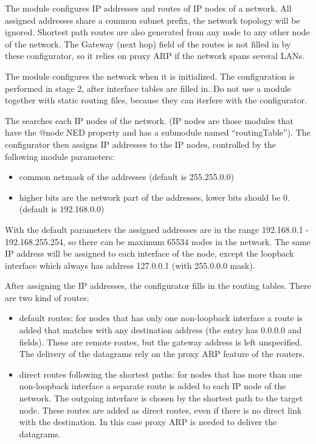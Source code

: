 The  module configures
IP addresses and routes of IP nodes of a network.
All assigned addresses share a common subnet prefix,
the network topology will be ignored. Shortest path
routes are also generated from any node to any other
node of the network. The Gateway (next hop) field of the routes
is not filled in by these configurator, so it relies
on proxy ARP if the network spans several LANs.


The  module configures
the network when it is initialized. The configuration
is performed in stage 2, after interface tables are
filled in. Do not use a 
module together with static routing files, because they
can iterfere with the configurator.

The  searches each IP nodes of the network.
(IP nodes are those modules that have the @node NED property and
has a  submodule named ``routingTable'').
The configurator then assigns IP addresses to the IP nodes, controlled
by the following module parameters:
\begin{itemize}
  \item {} common netmask of the addresses (default is 255.255.0.0)
  \item {} higher bits are the network part of the addresses,
        lower bits should be 0. (default is 192.168.0.0)
\end{itemize}

With the default parameters the assigned addresses are in the range
192.168.0.1 - 192.168.255.254, so there can be maximum 65534 nodes in the
network. The same IP address will be assigned to each interface
of the node, except the loopback interface which always has address 127.0.0.1
(with 255.0.0.0 mask).

After assigning the IP addresses, the configurator fills in the routing tables.
There are two kind of routes:
\begin{itemize}
  \item default routes: for nodes that has only one non-loopback interface
        a route is added that matches with any destination address
        (the entry has 0.0.0.0  and  fields).
        These are remote routes, but the gateway address is left unspecified.
        The delivery of the datagrams rely on the proxy ARP feature of the
        routers.
  \item direct routes following the shortest paths: for nodes that has more
        than one non-loopback interface a separate route is added to each
        IP node of the network. The outgoing interface is chosen by the
        shortest path to the target node. These routes are
        added as direct routes, even if there is no direct link with the
        destination. In this case proxy ARP is needed to deliver the datagrams.
\end{itemize}

